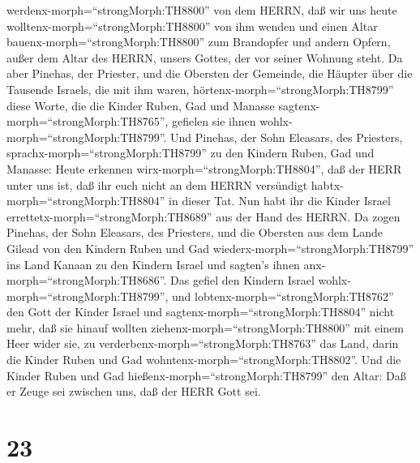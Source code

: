 werdenx-morph=``strongMorph:TH8800'' von dem HERRN, daß wir uns heute
wolltenx-morph=``strongMorph:TH8800'' von ihm wenden und einen Altar
bauenx-morph=``strongMorph:TH8800'' zum Brandopfer und andern Opfern,
außer dem Altar des HERRN, unsers Gottes, der vor seiner Wohnung steht.
 Da aber Pinehas, der Priester, und die Obersten der
Gemeinde, die Häupter über die Tausende Israels, die mit ihm waren,
hörtenx-morph=``strongMorph:TH8799'' diese Worte, die die Kinder Ruben,
Gad und Manasse sagtenx-morph=``strongMorph:TH8765'', gefielen sie ihnen
wohlx-morph=``strongMorph:TH8799''.  Und Pinehas, der Sohn
Eleasars, des Priesters, sprachx-morph=``strongMorph:TH8799'' zu den
Kindern Ruben, Gad und Manasse: Heute erkennen
wirx-morph=``strongMorph:TH8804'', daß der HERR unter uns ist, daß ihr
euch nicht an dem HERRN versündigt habtx-morph=``strongMorph:TH8804'' in
dieser Tat. Nun habt ihr die Kinder Israel
errettetx-morph=``strongMorph:TH8689'' aus der Hand des HERRN.
 Da zogen Pinehas, der Sohn Eleasars, des Priesters, und
die Obersten aus dem Lande Gilead von den Kindern Ruben und Gad
wiederx-morph=``strongMorph:TH8799'' ins Land Kanaan zu den Kindern
Israel und sagten's ihnen anx-morph=``strongMorph:TH8686''.
 Das gefiel den Kindern Israel
wohlx-morph=``strongMorph:TH8799'', und
lobtenx-morph=``strongMorph:TH8762'' den Gott der Kinder Israel und
sagtenx-morph=``strongMorph:TH8804'' nicht mehr, daß sie hinauf wollten
ziehenx-morph=``strongMorph:TH8800'' mit einem Heer wider sie, zu
verderbenx-morph=``strongMorph:TH8763'' das Land, darin die Kinder Ruben
und Gad wohntenx-morph=``strongMorph:TH8802''.  Und die
Kinder Ruben und Gad hießenx-morph=``strongMorph:TH8799'' den Altar: Daß
er Zeuge sei zwischen uns, daß der HERR Gott sei.

\hypertarget{section-22}{%
\section{23}\label{section-22}}

